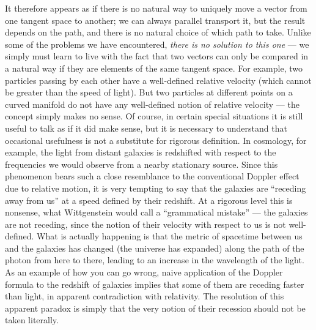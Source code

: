 \documentclass[12pt]{article}
\begin{document}
It therefore appears as if there is no natural way to uniquely move
a vector from one tangent space to another; we can always parallel
transport it, but the result depends on the path, and there is no
natural choice of which path to take.  Unlike some of the problems we
have encountered, {\it there is no solution to this one} --- we
simply must learn to live with the fact that two vectors can only
be compared in a natural way if they are elements of the same tangent
space.  For example, two particles passing by each other have a
well-defined relative velocity (which cannot be greater than the 
speed of light).  But two particles at different points on a curved
manifold do not have any well-defined notion of relative velocity ---
the concept simply makes no sense.  Of course, in certain special
situations it is still useful to talk as if it did make sense, but it
is necessary to understand that occasional usefulness is not a 
substitute for rigorous definition.  In cosmology, for example, the
light from distant galaxies is redshifted with respect to the frequencies
we would observe from a nearby stationary source.  Since this 
phenomenon bears such a close resemblance to the conventional Doppler
effect due to relative motion, it is very tempting to say that the
galaxies are ``receding away from us'' at a speed defined by their
redshift.  At a rigorous level this is nonsense, what Wittgenstein would
call a ``grammatical mistake'' --- the galaxies are not receding, since
the notion of their velocity with respect to us is not well-defined.
What is actually happening is that the metric of spacetime between
us and the galaxies has changed (the universe has expanded) along the
path of the photon from here to there, leading to an increase in the
wavelength of the light.  As an example of how you can go wrong,
naive application of the Doppler formula to the redshift of galaxies
implies that some of them are receding faster than light, in apparent
contradiction with relativity.  The resolution of this apparent paradox
is simply that the very notion of their recession should not be 
taken literally.
\end{document}
